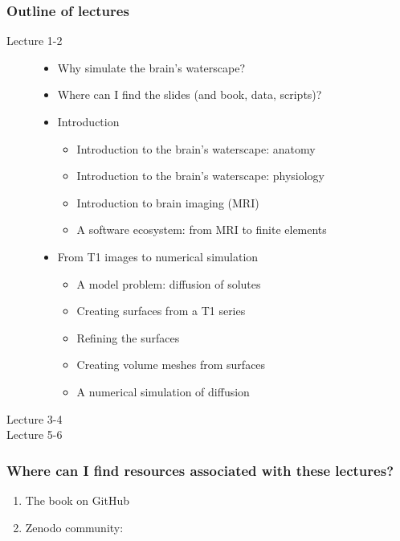 \documentclass[mathserif, aspectratio=169]{beamer}
\begin{document}
{
\begin{frame}
\end{frame}
}


\begin{frame}
  \frametitle{Outline of lectures}
  \begin{description}
    \item[Lecture 1-2]
      \begin{itemize}
      \item
        Why simulate the brain's waterscape?
      \item
        Where can I find the slides (and book, data, scripts)?
      \item
        Introduction
        \begin{itemize}
        \item
          Introduction to the brain's waterscape: anatomy
        \item
          Introduction to the brain's waterscape: physiology
        \item
          Introduction to brain imaging (MRI)
        \item
          A software ecosystem: from MRI to finite elements
        \end{itemize}
      \item
        From T1 images to numerical simulation
        \begin{itemize}
        \item
          A model problem: diffusion of solutes
        \item
          Creating surfaces from a T1 series
        \item
          Refining the surfaces
        \item
          Creating volume meshes from surfaces
        \item
          A numerical simulation of diffusion
        \end{itemize}
      \end{itemize}
    \item[Lecture 3-4]
    \item[Lecture 5-6]
  \end{description}

\end{frame}

\begin{frame}
  \frametitle{Where can I find resources associated with these lectures?}
  \begin{enumerate}
  \item
    The book on GitHub
  \item
    Zenodo community:
  \end{enumerate}
\end{frame}
\end{document}
